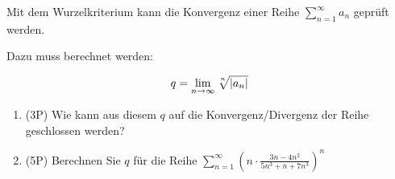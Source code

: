 Mit dem Wurzelkriterium kann die Konvergenz einer Reihe $\sum\limits_{n=1}^\infty a_n$ geprüft werden.

Dazu muss berechnet werden:

$$
	q = \lim\limits_{n\to\infty} \nroot{n}{|a_n|}
$$

\begin{enumerate}[label=(\alph*)]
	
	\item (3P) Wie kann aus diesem $q$ auf die Konvergenz/Divergenz der Reihe geschlossen werden?
	
		\bigskip
		\bigskip
		\bigskip
		\bigskip
		\bigskip
		\bigskip
		\bigskip
		\bigskip
		\bigskip
		\bigskip
		
	\item (5P) Berechnen Sie $q$ für die Reihe $\sum\limits_{n=1}^\infty \left(n \cdot \frac{3n-4n^2}{5n^3+n+7n^3}\right)^n$
		
\end{enumerate}
